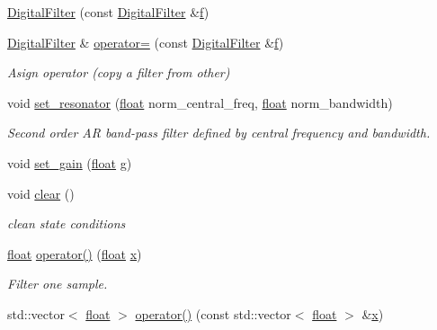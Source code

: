 \begin{DoxyCompactItemize}
\hyperlink{classupc_1_1DigitalFilter_a54937beb73f0789cb9265498522da628}{Digital\+Filter} (const \hyperlink{classupc_1_1DigitalFilter}{Digital\+Filter} \&\hyperlink{FFTReal__readme_8txt_abbf3cc73d1e3e4714ab1639819396eca}{f})
\item 
\hyperlink{classupc_1_1DigitalFilter}{Digital\+Filter} \& \hyperlink{classupc_1_1DigitalFilter_a26527559b1b71aad240deca22f5599ec}{operator=} (const \hyperlink{classupc_1_1DigitalFilter}{Digital\+Filter} \&\hyperlink{FFTReal__readme_8txt_abbf3cc73d1e3e4714ab1639819396eca}{f})
\begin{DoxyCompactList}\small\item\em Asign operator (copy a filter from other) \end{DoxyCompactList}\item 
void \hyperlink{classupc_1_1DigitalFilter_a2b97aaeacac8b5a8b52e1bd8fc295970}{set\+\_\+resonator} (\hyperlink{FFTReal__readme_8txt_a0ea2fae2a8106200bf378b90eae003cf}{float} norm\+\_\+central\+\_\+freq, \hyperlink{FFTReal__readme_8txt_a0ea2fae2a8106200bf378b90eae003cf}{float} norm\+\_\+bandwidth)
\begin{DoxyCompactList}\small\item\em Second order AR band-\/pass filter defined by central frequency and bandwidth. \end{DoxyCompactList}\item 
void \hyperlink{classupc_1_1DigitalFilter_a506905346c44ac46c292ea1fa1212c3e}{set\+\_\+gain} (\hyperlink{FFTReal__readme_8txt_a0ea2fae2a8106200bf378b90eae003cf}{float} g)
\item 
void \hyperlink{classupc_1_1DigitalFilter_ad6c0f9584687642434081448f85d89f9}{clear} ()
\begin{DoxyCompactList}\small\item\em clean state conditions \end{DoxyCompactList}\item 
\hyperlink{FFTReal__readme_8txt_a0ea2fae2a8106200bf378b90eae003cf}{float} \hyperlink{classupc_1_1DigitalFilter_a8d8f578b514a2dd58a545a68fdf441ee}{operator()} (\hyperlink{FFTReal__readme_8txt_a0ea2fae2a8106200bf378b90eae003cf}{float} \hyperlink{FFTReal__readme_8txt_a9c92ac89d1560f812393ca39a19e581e}{x})
\begin{DoxyCompactList}\small\item\em Filter one sample. \end{DoxyCompactList}\item 
std\+::vector$<$ \hyperlink{FFTReal__readme_8txt_a0ea2fae2a8106200bf378b90eae003cf}{float} $>$ \hyperlink{classupc_1_1DigitalFilter_aea8cdd6504cf9c4ae1a6d9a28e1bcaa4}{operator()} (const std\+::vector$<$ \hyperlink{FFTReal__readme_8txt_a0ea2fae2a8106200bf378b90eae003cf}{float} $>$ \&\hyperlink{FFTReal__readme_8txt_a9c92ac89d1560f812393ca39a19e581e}{x})

\end{DoxyCompactItemize}
